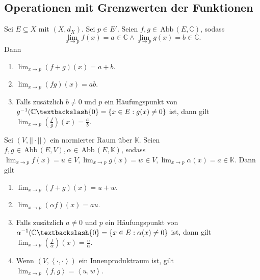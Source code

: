 \documentclass[a4paper,12pt]{article}
\begin{document}
\subsection{Operationen mit Grenzwerten der Funktionen}
Sei $E\subseteq X$ mit $(X,d_X)$. Sei $p \in E'$. Seien $f,g \in \,\text{Abb}\,(E,\mathbb{C})$, sodass
\[ 
        \lim_{x\rightarrow p}f(x)=a \in \mathbb{C}\land \lim_{x\rightarrow p}g(x)=b \in \mathbb{C}
.\] 
Dann
\begin{enumerate}[label=\arabic*.]
        \item $\lim_{x\rightarrow p}(f+g)(x)=a+b$.
        \item $\lim_{x\rightarrow p}(fg)(x)=ab$.
        \item Falls zusätzlich $b\neq 0$ und $p$ ein Häufungspunkt von $g^{-1}(\mathbb{C}\textbackslash\{0\}=\left\{x \in E:g(x)\neq 0\right\}$ ist, dann gilt $\lim_{x\rightarrow p}(\tfrac{f}{g})(x)=\tfrac{a}{b}$.
\end{enumerate}
Sei $(V,||\cdot ||)$ ein normierter Raum über $\mathbb{K}$. Seien $f,g \in \,\text{Abb}\,(E,V),\alpha  \in \,\text{Abb}\,(E,\mathbb{K})$, sodass $\lim_{x\rightarrow p}f(x)=u \in V,\lim_{x\rightarrow p}g(x)=w \in V,\lim_{x\rightarrow p}\alpha (x)=a \in \mathbb{K}$. Dann gilt
\begin{enumerate}[label=\arabic*.]
        \item $\lim_{x\rightarrow p}(f+g)(x)=u+w$.
        \item $\lim_{x\rightarrow p}(\alpha f)(x)=au$.
        \item Falls zusätzlich $a\neq 0$ und $p$ ein Häufungspunkt von $\alpha ^{-1}(\mathbb{C}\textbackslash\{0\}=\left\{x \in E:\alpha (x)\neq 0\right\}$ ist, dann gilt $\lim_{x\rightarrow p}(\tfrac{f}{\alpha })(x)=\tfrac{u}{\alpha }$.
        \item Wenn $(V,\left\langle \cdot ,\cdot \right\rangle )$ ein Innenproduktraum ist, gilt $\lim_{x\rightarrow p}\left\langle f,g\right\rangle =\left\langle u,w\right\rangle $.
\end{enumerate}
\end{document}
